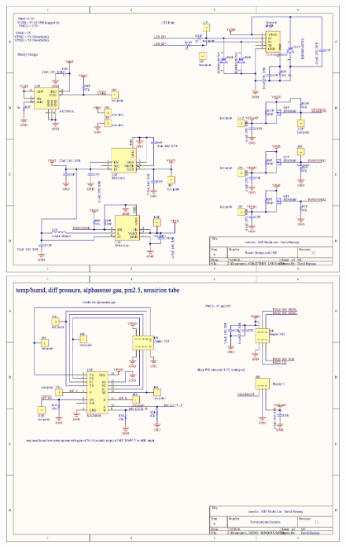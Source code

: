 \begin{figure}[htb]
 	\includegraphics[width=\textwidth + \marginparwidth]{schematics/la_schematic2} 
 	\includegraphics[width=\textwidth + \marginparwidth]{schematics/la_schematic3}                 
\end{figure}

